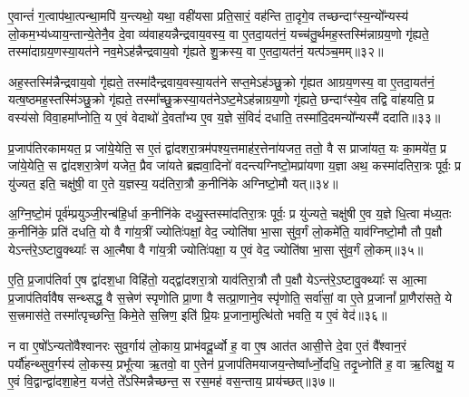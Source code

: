 ए॒वान्तं॑ ग॒त्वाप॑था॒त्पन्था॒मपि॑ य॒न्त्यथो॒ यथा॒ वही॑यसा प्रति॒सारं॒ वह॑न्ति ता॒दृगे॒व तच्छन्दाꣳ॑स्य॒न्यो᳚न्यस्य॑ लो॒कम॒भ्य॑ध्याय॒न्तान्ये॒तेनै॒व दे॒वा व्य॑वाहयन्नैन्द्रवाय॒वस्य॒ वा ए॒तदा॒यत॑नं॒ यच्च॑तु॒र्थमह॒स्तस्मि॑न्नाग्रय॒णो गृ॑ह्यते॒ तस्मा॑दाग्रय॒णस्या॒यत॑ने नव॒मे\-ऽह॑न्नैन्द्रवाय॒वो गृ॑ह्यते शु॒क्रस्य॒ वा ए॒तदा॒यत॑नं॒ यत्प॑ञ्च॒मम्॥३२॥

अह॒स्तस्मि॑न्नैन्द्रवाय॒वो गृ॑ह्यते॒ तस्मा॑दैन्द्रवाय॒वस्या॒यत॑ने सप्त॒मे\-ऽह॑ञ्छु॒क्रो गृ॑ह्यत आग्रय॒णस्य॒ वा ए॒तदा॒यत॑नं॒ यत्ष॒ष्ठमह॒स्तस्मि॑ञ्छु॒क्रो गृ॑ह्यते॒ तस्मा᳚च्छु॒क्रस्या॒यत॑ने\-ऽष्ट॒मे\-ऽह॑न्नाग्रय॒णो गृ॑ह्यते॒ छन्दाꣳ॑स्ये॒व तद्वि वा॑हयति॒ प्र वस्य॑सो विवा॒हमा᳚प्नोति॒ य ए॒वं वेदाथो॑ दे॒वता᳚भ्य ए॒व य॒ज्ञे सं॒विदं॑ दधाति॒ तस्मा॑दि॒दमन्यो᳚न्यस्मै॑ ददाति॥३३॥

{\anuvakamend[{ए॒तद्वै प॑ञ्च॒मे\-ऽह॒न्त्रैष्टु॑भ ए॒तद्गृ॑ह्यते य॒ज्ञस्य॑ प़ञ्च॒मम॒न्यस्मा॒ एक॑ञ्च॥८॥}]}

प्र॒जाप॑तिरकामयत॒ प्र जा॑ये॒येति॒ स ए॒तं द्वा॑दशरा॒त्रम॑पश्य॒त्तमाह॑र॒त्तेना॑यजत॒ ततो॒ वै स प्राजा॑यत॒ यः का॒मये॑त॒ प्र जा॑ये॒येति॒ स द्वा॑दशरा॒त्रेण॑ यजेत॒ प्रैव जा॑यते ब्रह्मवा॒दिनो॑ वदन्त्यग्निष्टो॒मप्रा॑यणा य॒ज्ञा अथ॒ कस्मा॑दतिरा॒त्रः पूर्वः॒ प्र यु॑ज्यत॒ इति॒ चक्षु॑षी॒ वा ए॒ते य॒ज्ञस्य॒ यद॑तिरा॒त्रौ क॒नीनि॑के अग्निष्टो॒मौ यत्॥३४॥

अ॒ग्नि॒ष्टो॒मं पूर्व॑म्प्रयुञ्जी॒रन्ब॑हि॒र्धा क॒नीनि॑के दध्यु॒स्तस्मा॑दतिरा॒त्रः पूर्वः॒ प्र यु॑ज्यते॒ चक्षु॑षी ए॒व य॒ज्ञे धि॒त्वा म॑ध्य॒तः क॒नीनि॑के॒ प्रति॑ दधति॒ यो वै गा॑य॒त्रीं ज्योतिः॑पक्षां॒ वेद॒ ज्योति॑षा भा॒सा सु॑व॒र्गं लो॒कमे॑ति॒ याव॑ग्निष्टो॒मौ तौ प॒क्षौ ये\-ऽन्त॑रे॒\-ऽष्टावु॒क्थ्याः᳚ स आ॒त्मैषा वै गा॑य॒त्री ज्योतिः॑पक्षा॒ य ए॒वं वेद॒ ज्योति॑षा भा॒सा सु॑व॒र्गं लो॒कम्॥३५॥

ए॒ति॒ प्र॒जाप॑तिर्वा ए॒ष द्वा॑दश॒धा विहि॑तो॒ यद्द्वा॑दशरा॒त्रो याव॑तिरा॒त्रौ तौ प॒क्षौ ये\-ऽन्त॑रे॒\-ऽष्टावु॒क्थ्याः᳚ स आ॒त्मा प्र॒जाप॑तिर्वावैष सन्थ्सद्ध॒ वै स॒त्त्रेण॑ स्पृणोति प्रा॒णा वै सत्प्रा॒णाने॒व स्पृ॑णोति॒ सर्वा॑सां॒ वा ए॒ते प्र॒जानां᳚ प्रा॒णैरा॑सते॒ ये स॒त्त्रमास॑ते॒ तस्मा᳚त्पृच्छन्ति॒ किमे॒ते स॒त्त्रिण॒ इति॑ प्रि॒यः प्र॒जाना॒मुत्थि॑तो भवति॒ य ए॒वं वेद॑॥३६॥

{\anuvakamend[{अ॒ग्नि॒ष्टो॒मौ यथ्सु॑व॒र्गल्लों॒कं प्रि॒यः प्र॒जानां॒ पञ्च॑ च॥९॥}]}

न वा ए॒षो᳚\-ऽन्यतो॑वैश्वानरः सुव॒र्गाय॑ लो॒काय॒ प्राभ॑वदू॒र्ध्वो ह॒ वा ए॒ष आत॑त आसी॒त्ते दे॒वा ए॒तं वै᳚श्वान॒रं पर्यौ॑हन्थ्सुव॒र्गस्य॑ लो॒कस्य॒ प्रभू᳚त्या ऋ॒तवो॒ वा ए॒तेन॑ प्र॒जाप॑तिमयाजय॒न्तेष्वा᳚र्ध्नो॒दधि॒ तदृ॒ध्नोति॑ ह॒ वा ऋ॒त्विक्षु॒ य ए॒वं वि॒द्वान्द्वा॑दशा॒हेन॒ यज॑ते॒ ते᳚\-ऽस्मिन्नैच्छन्त॒ स रस॒मह॑ वस॒न्ताय॒ प्राय॑च्छत्॥३७॥

